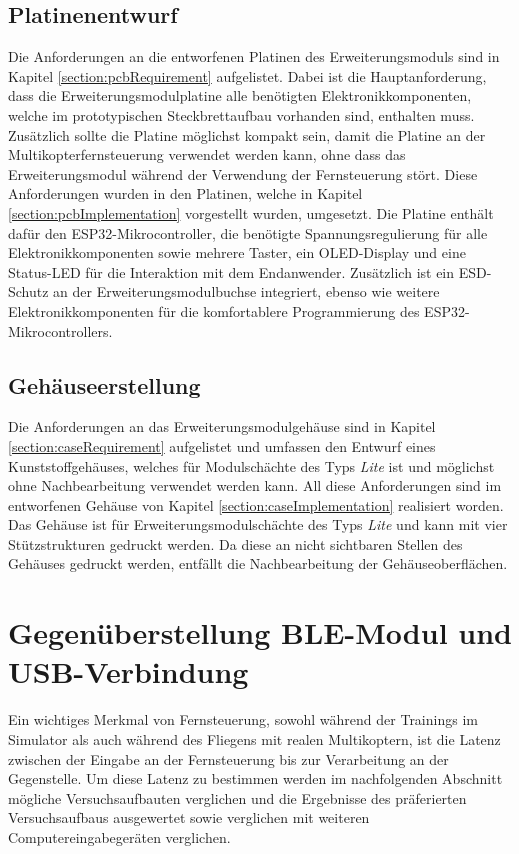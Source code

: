 \subsection{Platinenentwurf}
Die Anforderungen an die entworfenen Platinen des Erweiterungsmoduls sind in Kapitel \ref{section:pcbRequirement} aufgelistet. Dabei ist die Hauptanforderung, dass die Erweiterungsmodulplatine alle benötigten Elektronikkomponenten, welche im prototypischen Steckbrettaufbau vorhanden sind, enthalten muss. Zusätzlich sollte die Platine möglichst kompakt sein, damit die Platine an der Multikopterfernsteuerung verwendet werden kann, ohne dass das Erweiterungsmodul während der Verwendung der Fernsteuerung stört. Diese Anforderungen wurden in den Platinen, welche in Kapitel \ref{section:pcbImplementation} vorgestellt wurden, umgesetzt. Die Platine enthält dafür den ESP32-Mikrocontroller, die benötigte Spannungsregulierung für alle Elektronikkomponenten sowie mehrere Taster, ein \acs{OLED}-Display und eine Status-\acs{LED} für die Interaktion mit dem Endanwender. Zusätzlich ist ein \ac{ESD}-Schutz an der Erweiterungsmodulbuchse integriert, ebenso wie weitere Elektronikkomponenten für die komfortablere Programmierung des ESP32-Mikrocontrollers.

\subsection{Gehäuseerstellung}
Die Anforderungen an das Erweiterungsmodulgehäuse sind in Kapitel \ref{section:caseRequirement} aufgelistet und umfassen den Entwurf eines Kunststoffgehäuses, welches für Modulschächte des Typs \textit{Lite} ist und möglichst ohne Nachbearbeitung verwendet werden kann. All diese Anforderungen sind im entworfenen Gehäuse von Kapitel \ref{section:caseImplementation} realisiert worden. Das Gehäuse ist für Erweiterungsmodulschächte des Typs \textit{Lite} und kann mit vier Stützstrukturen gedruckt werden. Da diese an nicht sichtbaren Stellen des Gehäuses gedruckt werden, entfällt die Nachbearbeitung der Gehäuseoberflächen.

\section{Gegenüberstellung \acs{BLE}-Modul und USB-Verbindung}
Ein wichtiges Merkmal von Fernsteuerung, sowohl während der Trainings im Simulator als auch während des Fliegens mit realen Multikoptern, ist die Latenz zwischen der Eingabe an der Fernsteuerung bis zur Verarbeitung an der Gegenstelle. Um diese Latenz zu bestimmen werden im nachfolgenden Abschnitt mögliche Versuchsaufbauten verglichen und  die Ergebnisse des präferierten Versuchsaufbaus ausgewertet sowie verglichen mit weiteren Computereingabegeräten verglichen.

